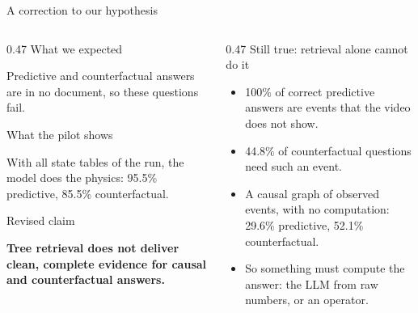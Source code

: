 \documentclass[aspectratio=169,11pt]{beamer}
\newcommand{\lbl}[1]{{\color{Mute}\fontsize{9.5}{12}\selectfont #1}\par}
\begin{document}
\begin{frame}{A correction to our hypothesis}
  \vspace{0.25cm}
  \begin{columns}[T,onlytextwidth]
    \begin{column}{0.47\textwidth}
      \lbl{What we expected}
      {\fontsize{10.5}{13.5}\selectfont
      Predictive and counterfactual answers are in no document, so these questions fail.\par}
      \vspace{0.12cm}
      \lbl{What the pilot shows}
      {\fontsize{10.5}{13.5}\selectfont
      With all state tables of the run, the model does the physics: 95.5\% predictive, 85.5\% counterfactual.\par}
      \vspace{0.12cm}
      \lbl{Revised claim}
      {\color{Ink}\fontsize{11}{14}\selectfont\bfseries Tree retrieval does not deliver clean, complete evidence for causal and counterfactual answers.\par}
    \end{column}
    \begin{column}{0.47\textwidth}
      \lbl{Still true: retrieval alone cannot do it}
      {\fontsize{10}{13}\selectfont
      \begin{itemize}\setlength{\itemsep}{2pt}
        \item 100\% of correct predictive answers are events that the video does not show.
        \item 44.8\% of counterfactual questions need such an event.
        \item A causal graph of observed events, with no computation: 29.6\% predictive, 52.1\% counterfactual.
        \item So something must compute the answer: the LLM from raw numbers, or an operator.
      \end{itemize}}
    \end{column}
  \end{columns}
\end{frame}
\end{document}
